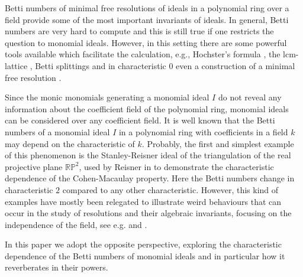 \documentclass[11pt,oneside]{amsart}
\theoremstyle{plain}
\theoremstyle{definition}
\newcommand{\RP}{\mathbb{RP}}
\begin{document}
Betti numbers of minimal free resolutions of ideals in a polynomial ring over a field provide some of the most important invariants of ideals. In general, Betti numbers are very hard to compute and this is still true
if one restricts the question to monomial ideals. However, in this setting there are 
some powerful tools available which 
facilitate the calculation, e.g., Hochster's formula \cite{H77}, the lcm-lattice \cite{GPW99}, Betti splittings \cite{FHV09, B16, BF20}
and in characteristic $0$ even a construction of a minimal free resolution \cite{EMO19}.

Since the monic monomials generating a monomial ideal $I$ do not reveal any
information about the coefficient field of the polynomial ring, monomial
ideals can be considered over any coefficient field. 
It is well known that the Betti numbers of a monomial ideal $I$ in a polynomial ring with coefficients in a field $k$ may depend on the characteristic of $k$.
Probably, the first and simplest example of this phenomenon is the Stanley-Reisner ideal of the triangulation of the real projective plane $\RP^2$, used by Reisner in \cite{R76} to demonstrate the characteristic dependence of the
Cohen-Macaulay property. Here the Betti numbers change in characteristic $2$ compared to any other characteristic. However, this kind of examples have mostly been relegated to illustrate weird behaviours that can occur in the study of resolutions and their algebraic invariants, focusing on the independence of the field, see e.g. \cite{K06} and \cite{DK14}.

In this paper we adopt the opposite perspective, exploring the characteristic dependence of the Betti numbers of monomial ideals and 
in particular how it reverberates in their powers.
\end{document}
